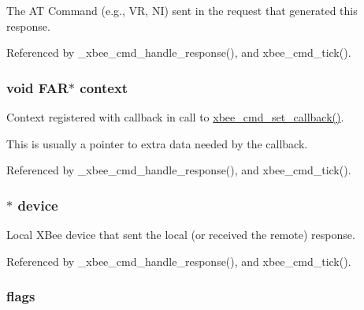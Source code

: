 The A\-T Command (e.\-g., V\-R, N\-I) sent in the request that generated this response. 



Referenced by \-\_\-xbee\-\_\-cmd\-\_\-handle\-\_\-response(), and xbee\-\_\-cmd\-\_\-tick().

\hypertarget{structxbee__cmd__response__t_aa91f8e864e06077c354e5f5216547758}{
\subsubsection[{context}]{\setlength{\rightskip}{0pt plus 5cm}void {\bf F\-A\-R}$\ast$ context}}\label{structxbee__cmd__response__t_aa91f8e864e06077c354e5f5216547758}


Context registered with callback in call to \hyperlink{group__xbee__atcmd_ga0a5d2e2e87743061c46abd53e379e014}{xbee\-\_\-cmd\-\_\-set\-\_\-callback()}. 

This is usually a pointer to extra data needed by the callback. 

Referenced by \-\_\-xbee\-\_\-cmd\-\_\-handle\-\_\-response(), and xbee\-\_\-cmd\-\_\-tick().

\hypertarget{structxbee__cmd__response__t_ac780e07a2b2cd8df18f56240588090c5}{
\subsubsection[{device}]{$\ast$ device}}\label{structxbee__cmd__response__t_ac780e07a2b2cd8df18f56240588090c5}


Local X\-Bee device that sent the local (or received the remote) response. 



Referenced by \-\_\-xbee\-\_\-cmd\-\_\-handle\-\_\-response(), and xbee\-\_\-cmd\-\_\-tick().

\hypertarget{structxbee__cmd__response__t_a1e87af3c18a2fd36c61faf89949bdc3f}{
\subsubsection[{flags}]{ flags}}\label{structxbee__cmd__response__t_a1e87af3c18a2fd36c61faf89949bdc3f}


